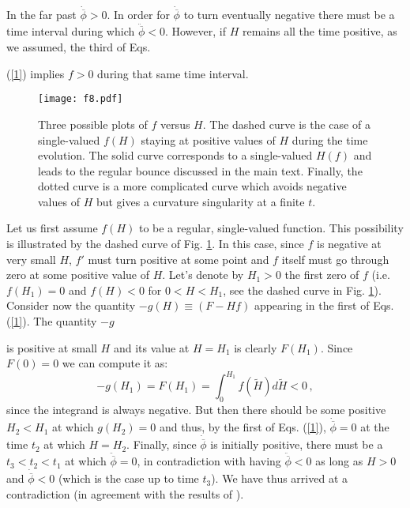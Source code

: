 \documentclass[a4paper,11pt]{article}
\def\beq{\begin{equation}}
\def\eeq{\end{equation}}
\def \fb {\overline \phi}
\def \fbp {\dot{\fb}}
\def \fbpp {\ddot{\fb}}
\begin{document}
 In the far past $\fbp >0$. In order for $ \fbp$ to turn eventually negative there must be a time interval during which  $\fbpp < 0$. However, if $H$ remains all the time positive, as we assumed, the third of Eqs. {(\ref{1}) implies  $f > 0$ during that same time interval. 

 \begin{figure}[t]
\centering
\texttt{[image: f8.pdf]}
\caption{Three possible plots of $f$ versus $H$. The dashed curve is the case of a single-valued $f(H)$ staying at positive values of $H$ during the time evolution. The solid curve corresponds to a single-valued $H(f)$ and leads to the regular bounce discussed in the main text. Finally, the dotted curve is a more complicated curve which avoids negative values of $H$ but gives a curvature singularity at a finite $t$.}
\label{f8}
\end{figure} 

 Let us first assume $f(H)$ to be a regular, single-valued function. This possibility is illustrated by the dashed curve of Fig. \ref{f8}. In this case,
 since $f$ is negative at very small $H$, $f'$ must turn positive at some point and $f$ itself must go through zero at some positive value of $H$. Let's denote by $H_1 > 0$ the first zero of $f$ (i.e. $f(H_1)=0$ and $f(H) < 0$ for $0 < H < H_1$, see the dashed curve in Fig. \ref{f8}).  
  Consider now the quantity $-g(H) \equiv (F - H f)$ appearing in the first of Eqs. (\ref{1}). The quantity $-g$} is positive at small $H$ and its value at $H = H_1$ is clearly $F(H_1)$. Since $F(0) =0$ we  can compute it as:
 \beq
-g(H_1) = F(H_1) = \int_0^{H_1}  f(\tilde{H}) d \tilde{H} <0\,,
\label{A1}
\eeq
 since the integrand is always negative. But then there should be some positive $H_2 < H_1$ at which $g(H_2) =0$ and thus, by the first of Eqs. (\ref{1}), $\fbp = 0$ at the time $t_2$ at which $H= H_2$. Finally, since $\fbp$ is initially positive, there must be a $t_3 < t_2< t_1$ at which $\fbpp =0$, in contradiction with having $\fbpp <0$ as long as $H >0$ and $\fbp <0$ (which is the case up to time $t_3$). We have thus arrived at a contradiction (in agreement with the results of \cite{4}). 
\end{document}
